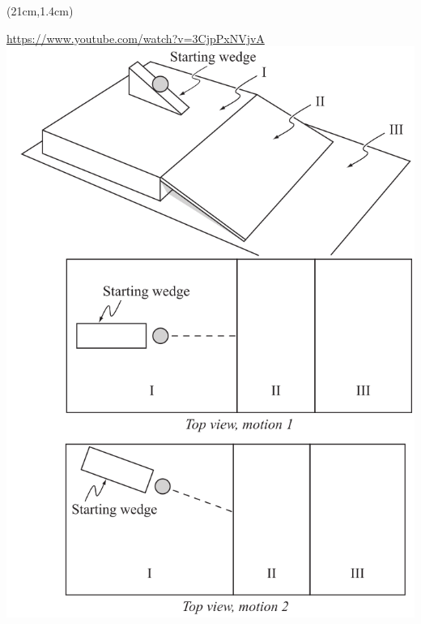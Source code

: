 \documentclass[]{article}
\begin{document}
\begin{textblock*}{5cm}(21cm,1.4cm)
\begin{center}
	\href{https://www.youtube.com/watch?v=3CjpPxNVjvA}{\tiny https://www.youtube.com/watch?v=3CjpPxNVjvA}
	\includegraphics[scale=0.25]{WedgeRamp.png}
\end{center}
\end{textblock*}
\newpage
\end{document}
